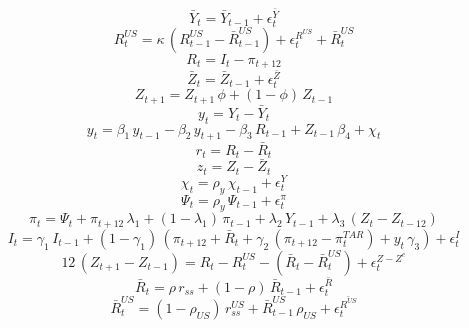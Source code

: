 \begin{dmath}
{\bar{Y}_{t}}={\bar{Y}_{t-1}}+{\epsilon^{\bar{Y}}_{t}}
\end{dmath}
\begin{dmath}
{R^{US}_{t}}={\kappa}\, \left({R^{US}_{t-1}}-{\bar{R}^{US}_{t-1}}\right)+{\epsilon^{R^{US}}_{t}}+{\bar{R}^{US}_{t}}
\end{dmath}
\begin{dmath}
{R_{t}}={I_{t}}-{\pi_{t+12}}
\end{dmath}
\begin{dmath}
{\bar{Z}_{t}}={\bar{Z}_{t-1}}+{\epsilon^{\bar{Z}}_{t}}
\end{dmath}
\begin{dmath}
{Z_{t+1}}={Z_{t+1}}\, {\phi}+\left(1-{\phi}\right)\, {Z_{t-1}}
\end{dmath}
\begin{dmath}
{y_{t}}={Y_{t}}-{\bar{Y}_{t}}
\end{dmath}
\begin{dmath}
{y_{t}}={\beta_{1}}\, {y_{t-1}}-{\beta_{2}}\, {y_{t+1}}-{\beta_{3}}\, {R_{t-1}}+{Z_{t-1}}\, {\beta_{4}}+{\chi_{t}}
\end{dmath}
\begin{dmath}
{r_{t}}={R_{t}}-{\bar{R}_{t}}
\end{dmath}
\begin{dmath}
{z_{t}}={Z_{t}}-{\bar{Z}_{t}}
\end{dmath}
\begin{dmath}
{\chi_{t}}={\rho_{y}}\, {\chi_{t-1}}+{\epsilon^{Y}_{t}}
\end{dmath}
\begin{dmath}
{\Psi_{t}}={\rho_{y}}\, {\Psi_{t-1}}+{\epsilon^{\pi}_{t}}
\end{dmath}
\begin{dmath}
{\pi_{t}}={\Psi_{t}}+{\pi_{t+12}}\, {\lambda_{1}}+\left(1-{\lambda_{1}}\right)\, {\pi_{t-1}}+{\lambda_{2}}\, {Y_{t-1}}+{\lambda_{3}}\, \left({Z_{t}}-{Z_{t-12}}\right)
\end{dmath}
\begin{dmath}
{I_{t}}={\gamma_{1}}\, {I_{t-1}}+\left(1-{\gamma_{1}}\right)\, \left({\pi_{t+12}}+{\bar{R}_{t}}+{\gamma_{2}}\, \left({\pi_{t+12}}-{\pi^{TAR}_{t}}\right)+{y_{t}}\, {\gamma_{3}}\right)+{\epsilon^{I}_{t}}
\end{dmath}
\begin{dmath}
12\, \left({Z_{t+1}}-{Z_{t-1}}\right)={R_{t}}-{R^{US}_{t}}-\left({\bar{R}_{t}}-{\bar{R}^{US}_{t}}\right)+{\epsilon^{Z-Z^{e}}_{t}}
\end{dmath}
\begin{dmath}
{\bar{R}_{t}}={\rho}\, {r_{ss}}+\left(1-{\rho}\right)\, {\bar{R}_{t-1}}+{\epsilon^{\bar{R}}_{t}}
\end{dmath}
\begin{dmath}
{\bar{R}^{US}_{t}}=\left(1-{\rho_{US}}\right)\, {r^{US}_{ss}}+{\bar{R}^{US}_{t-1}}\, {\rho_{US}}+{\epsilon^{\bar{R^{US}}}_{t}}
\end{dmath}

